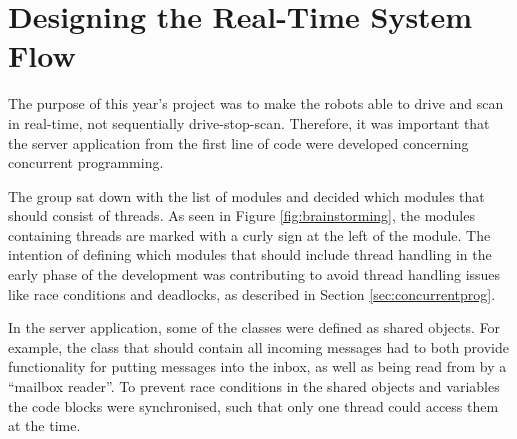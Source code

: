 \section{Designing the Real-Time System Flow}
The purpose of this year's project was to make the robots able to drive and scan in real-time, not sequentially drive-stop-scan. Therefore, it was important that the server application from the first line of code were developed concerning concurrent programming.

The group sat down with the list of modules and decided which modules that should consist of threads. As seen in Figure \ref{fig:brainstorming}, the modules containing threads are marked with a curly sign at the left of the module. The intention of defining which modules that should include thread handling in the early phase of the development was contributing to avoid thread handling issues like race conditions and deadlocks, as described in Section \ref{sec:concurrentprog}.

In the server application, some of the classes were defined as shared objects. For example, the class that should contain all incoming messages had to both provide functionality for putting messages into the inbox, as well as being read from by a ``mailbox reader''. To prevent race conditions in the shared objects and variables the code blocks were synchronised, such that only one thread could access them at the time.